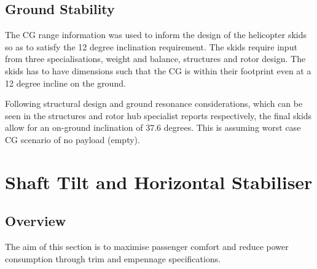 \documentclass[11pt,a4paper]{article}
\begin{document}
\subsection{Ground Stability}

The CG range information was used to inform the design of the helicopter skids so as to satisfy the 12 degree inclination requirement. 
The skids require input from three specialisations, weight and balance, structures and rotor design. The skids has to have dimensions such that the CG is within their footprint even at a 12 degree incline on the ground.

Following structural design and ground resonance considerations, which can be seen in the structures and rotor hub specialist reports respectively, the final skids allow for an on-ground inclination of 37.6 degrees. This is assuming worst case CG scenario of no payload (empty).\\


\section{Shaft Tilt and Horizontal Stabiliser}

\subsection{Overview}
The aim of this section is to maximise passenger comfort and reduce power consumption through trim and empennage specifications.
\end{document}
